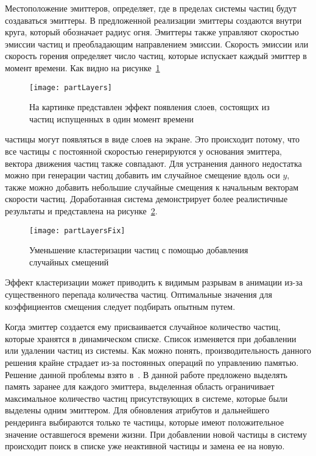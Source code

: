 Местоположение эмиттеров, определяет, где в пределах системы частиц будут
создаваться эмиттеры. В предложенной реализации эмиттеры создаются внутри круга,
который обозначает радиус огня. Эмиттеры также управляют скоростью эмиссии
частиц и преобладающим направлением эмиссии. Скорость эмиссии или скорость
горения определяет число частиц, которые испускает каждый эмиттер в момент
времени. Как видно на рисунке~\ref{fig:partLayers}
\begin{figure}[htb]
	\centering
	\texttt{[image: partLayers]}
    \caption{На картинке представлен эффект появления слоев, состоящих из частиц
    испущенных в один момент времени}%
    \label{fig:partLayers}
\end{figure}
частицы могут появляться в виде слоев на экране. Это происходит потому, что все
частицы с постоянной скоростью генерируются у основания эмиттера, вектора
движения частиц также совпадают. Для устранения данного недостатка можно при
генерации частиц добавить им случайное смещение вдоль оси $y$, также можно
добавить небольшие случайные смещения к начальным векторам скорости частиц.
Доработанная система демонстрирует более реалистичные результаты и представлена
на рисунке~\ref{fig:partLayersFix}.
\begin{figure}[htb]
	\centering
	\texttt{[image: partLayersFix]}
    \caption{Уменьшение кластеризации частиц с помощью добавления случайных
    смещений}%
    \label{fig:partLayersFix}
\end{figure}
Эффект кластеризации может приводить к видимым разрывам в анимации из-за
существенного перепада количества частиц. Оптимальные значения для коэффициентов
смещения следует подбирать опытным путем.

Когда эмиттер создается ему присваивается случайное количество частиц, которые
хранятся в динамическом списке. Список изменяется при добавлении или удалении
частиц из системы. Как можно понять, производительность данного решения крайне
страдает из-за постоянных операций по управлению памятью. Решение данной
проблемы взято в~\cite{LearnOGL}. В данной работе предложено выделять память
заранее для каждого эмиттера, выделенная область ограничивает максимальное
количество частиц присутствующих в системе, которые были выделены одним
эмиттером. Для обновления атрибутов и дальнейшего рендеринга выбираются только
те частицы, которые имеют положительное значение оставшегося времени жизни. При
добавлении новой частицы в систему происходит поиск в списке уже неактивной
частицы и замена ее на новую.

